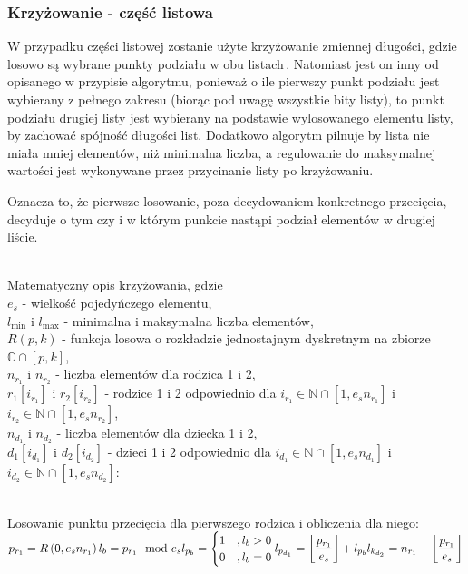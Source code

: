\subsubsection{Krzyżowanie - część listowa}
W przypadku części listowej zostanie użyte krzyżowanie zmiennej długości,
gdzie losowo są wybrane punkty podziału w obu listach\,.
Natomiast jest on inny od opisanego w przypisie algorytmu,
ponieważ o ile pierwszy punkt podziału jest wybierany z pełnego zakresu
(biorąc pod uwagę wszystkie bity listy),
to punkt podziału drugiej listy jest wybierany na podstawie
wylosowanego elementu listy, by zachować spójność długości list.
Dodatkowo algorytm pilnuje by lista nie miała mniej elementów,
niż minimalna liczba, a regulowanie do maksymalnej wartości
jest wykonywane przez przycinanie listy po krzyżowaniu.

\noindent
Oznacza to, że pierwsze losowanie,
poza decydowaniem konkretnego przecięcia, decyduje o tym czy
i w którym punkcie nastąpi podział elementów w drugiej liście.

\noindent\\
Matematyczny opis krzyżowania, gdzie\\
$e_s$ - wielkość pojedyńczego elementu,\\
$l_{\min}$ i $l_{\max}$ - minimalna i maksymalna liczba elementów,\\
$R\left(p, k\right)$ - funkcja losowa o rozkładzie jednostajnym dyskretnym
  na zbiorze $\mathbb{C} \cap \left[p, k\right]$,\\
$n_{r_1}$ i $n_{r_2}$ - liczba elementów dla rodzica 1 i 2,\\
$r_1\left[i_{r_1}\right]$ i $r_2\left[i_{r_2}\right]$ -
  rodzice 1 i 2 odpowiednio dla
  $i_{r_1} \in \mathbb{N} \cap \left[1, e_s n_{r_1}\right]$
  i $i_{r_2} \in \mathbb{N} \cap \left[1, e_s n_{r_2}\right]$,\\
$n_{d_1}$ i $n_{d_2}$ - liczba elementów dla dziecka 1 i 2,\\
$d_1\left[i_{d_1}\right]$ i $d_2\left[i_{d_2}\right]$ -
  dzieci 1 i 2 odpowiednio dla
  $i_{d_1} \in \mathbb{N} \cap \left[1, e_s n_{d_1}\right]$
  i $i_{d_2} \in \mathbb{N} \cap \left[1, e_s n_{d_2}\right]$:

\noindent\\
Losowanie punktu przecięcia dla pierwszego rodzica i obliczenia dla niego:\\
$\displaystyle
  p_{r_1}=R\left(0, e_s n_{r_1}\right)\\
  l_b=p_{r_1} \mod e_s\\
  l_{p_b}=\begin{cases}
    1 &, l_b>0\\
    0 &, l_b=0
  \end{cases}\\
  l_{p_{d_1}}=\left\lfloor
    \frac{p_{r_1}}{e_s}
  \right\rfloor + l_{p_b}\\
  l_{k_{d_2}}=n_{r_1}-\left\lfloor
    \frac{p_{r_1}}{e_s}
  \right\rfloor
$

